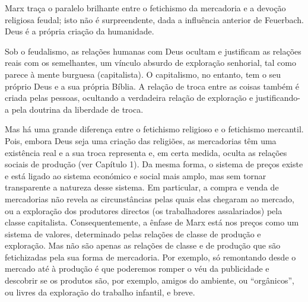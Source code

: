  \par 
Marx traça o paralelo brilhante entre o fetichismo da mercadoria e a devoção religiosa feudal; isto não é surpreendente, dada a influência anterior de Feuerbach. Deus é a própria criação da humanidade.
 \par 
Sob o feudalismo, as relações humanas com Deus ocultam e justificam as relações reais com os semelhantes, um vínculo absurdo de exploração senhorial, tal como parece à mente burguesa (capitalista). O capitalismo, no entanto, tem o seu próprio Deus e a sua própria Bíblia. A relação de troca entre as coisas também é criada pelas pessoas, ocultando a verdadeira relação de exploração e justificando-a pela doutrina da liberdade de troca.
 \par 
Mas há uma grande diferença entre o fetichismo religioso e o fetichismo mercantil. Pois, embora Deus seja uma criação das religiões, as mercadorias têm uma existência real e a sua troca representa e, em certa medida, oculta as relações sociais de produção (ver Capítulo {\color{blue}1}). Da mesma forma, o sistema de preços existe e está ligado ao sistema económico e social mais amplo, mas sem tornar transparente a natureza desse sistema. Em particular, a compra e venda de mercadorias não revela as circunstâncias pelas quais elas chegaram ao mercado, ou a exploração dos produtores directos (os trabalhadores assalariados) pela classe capitalista. Consequentemente, a ênfase de Marx está nos preços como um sistema de valores, determinado pelas relações de classe de produção e exploração. Mas não são apenas as relações de classe e de produção que são fetichizadas pela sua forma de mercadoria. Por exemplo, só remontando desde o mercado até à produção é que poderemos romper o véu da publicidade e descobrir se os produtos são, por exemplo, amigos do ambiente, ou “orgânicos”, ou livres da exploração do trabalho infantil, e breve.
 \par 
